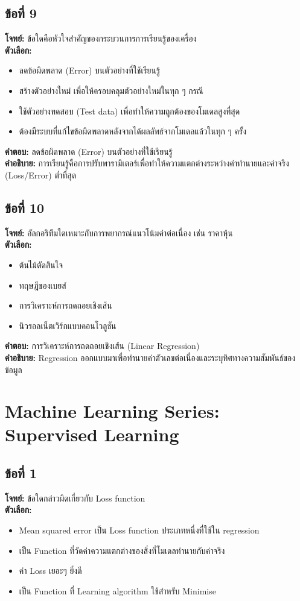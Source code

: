\documentclass[12pt]{article}
\begin{document}
\subsection*{ข้อที่ 9}
\textbf{โจทย์:} ข้อใดคือหัวใจสำคัญของกระบวนการการเรียนรู้ของเครื่อง\\
\textbf{ตัวเลือก:}
\begin{itemize}
    \item ลดข้อผิดพลาด (Error) บนตัวอย่างที่ใช้เรียนรู้
    \item สร้างตัวอย่างใหม่ เพื่อให้ครอบคลุมตัวอย่างใหม่ในทุก ๆ กรณี
    \item ใช้ตัวอย่างทดสอบ (Test data) เพื่อทำให้ความถูกต้องของโมเดลสูงที่สุด
    \item ต้องมีระบบที่แก้ไขข้อผิดพลาดหลังจากได้ผลลัพธ์จากโมเดลแล้วในทุก ๆ ครั้ง
\end{itemize}

\textbf{คำตอบ:} ลดข้อผิดพลาด (Error) บนตัวอย่างที่ใช้เรียนรู้\\
\textbf{คำอธิบาย:} การเรียนรู้คือการปรับพารามิเตอร์เพื่อทำให้ความแตกต่างระหว่างค่าทำนายและค่าจริง (Loss/Error) ต่ำที่สุด

\subsection*{ข้อที่ 10}
\textbf{โจทย์:} อัลกอริทึมใดเหมาะกับการพยากรณ์แนวโน้มค่าต่อเนื่อง เช่น ราคาหุ้น\\
\textbf{ตัวเลือก:}
\begin{itemize}
    \item ต้นไม้ตัดสินใจ
    \item ทฤษฎีของเบยส์
    \item การวิเคราะห์การถดถอยเชิงเส้น
    \item นิวรอลเน็ตเวิร์กแบบคอนโวลูชัน
\end{itemize}

\textbf{คำตอบ:} การวิเคราะห์การถดถอยเชิงเส้น (Linear Regression)\\
\textbf{คำอธิบาย:} Regression ออกแบบมาเพื่อทำนายค่าตัวเลขต่อเนื่องและระบุทิศทางความสัมพันธ์ของข้อมูล

\newpage
\section{Machine Learning Series: Supervised Learning}

\subsection*{ข้อที่ 1}
\textbf{โจทย์:} ข้อใดกล่าวผิดเกี่ยวกับ Loss function\\
\textbf{ตัวเลือก:}
\begin{itemize}
    \item Mean squared error เป็น Loss function ประเภทหนึ่งที่ใช้ใน regression
    \item เป็น Function ที่วัดค่าความแตกต่างของสิ่งที่โมเดลทำนายกับค่าจริง
    \item ค่า Loss เยอะๆ ยิ่งดี
    \item เป็น Function ที่ Learning algorithm ใช้สำหรับ Minimise
\end{itemize}
\end{document}
